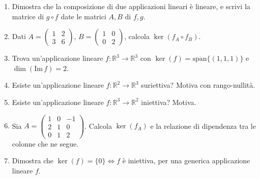 \documentclass[a4paper,11pt]{article}
\begin{document}
\begin{enumerate}
  \item Dimostra che la composizione di due applicazioni lineari è lineare, e scrivi la matrice di $g\circ f$ date le matrici $A,B$ di $f,g$.
  \item Dati $A=\begin{pmatrix}1&2\\3&6\end{pmatrix}$, $B=\begin{pmatrix}1&0\\0&2\end{pmatrix}$, calcola $\ker(f_A\circ f_B)$.
  \item Trova un'applicazione lineare $f:\mathbb R^3\to\mathbb R^3$ con $\ker(f)=\mathrm{span}\{(1,1,1)\}$ e $\dim(\mathrm{Im}\,f)=2$.
  \item Esiste un'applicazione lineare $f:\mathbb R^2\to\mathbb R^3$ suriettiva? Motiva con rango-nullità.
  \item Esiste un'applicazione lineare $f:\mathbb R^3\to\mathbb R^2$ iniettiva? Motiva.
  \item Sia $A=\begin{pmatrix}1&0&-1\\2&1&0\\0&1&2\end{pmatrix}$. Calcola $\ker(f_A)$ e la relazione di dipendenza tra le colonne che ne segue.
  \item Dimostra che $\ker(f)=\{0\}\iff f$ è iniettiva, per una generica applicazione lineare $f$.
\end{enumerate}

\end{document}
